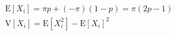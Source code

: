 \documentclass[preview]{standalone}
\begin{document}
\begin{align*}
\mathrm{E}\left[X_{i}\right]=\pi p + (-\pi)(1 - p) =\pi(2p - 1) \\\mathrm{V}\left[X_{i}\right]=\mathrm{E}\left[X_{i}^{2}\right]-\mathrm{E}\left[X_{i}\right]^{2} \\
\end{align*}
\end{document}

